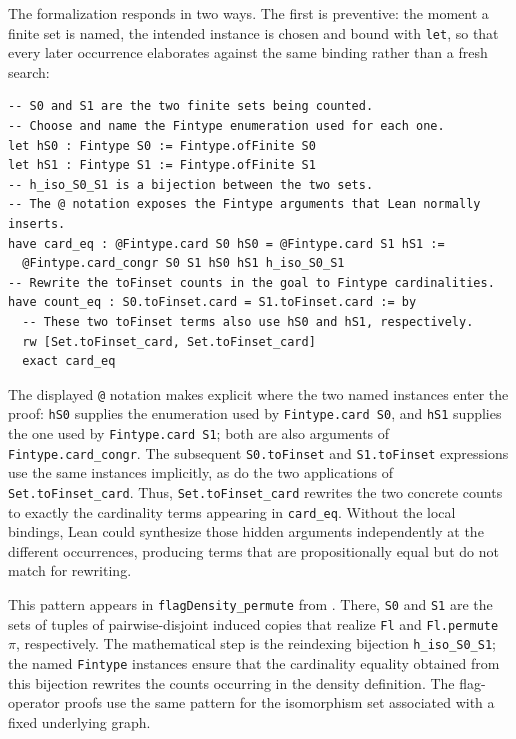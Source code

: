 \documentclass{article}
\newcommand{\lean}[1]{\texttt{#1}}
\begin{document}
The formalization responds in two ways.  The first is preventive: the
moment a finite set is named, the intended instance is chosen and bound
with \lean{let}, so that every later occurrence elaborates against the same
binding rather than a fresh search:
\begin{lstlisting}
-- S0 and S1 are the two finite sets being counted.
-- Choose and name the Fintype enumeration used for each one.
let hS0 : Fintype S0 := Fintype.ofFinite S0
let hS1 : Fintype S1 := Fintype.ofFinite S1
-- h_iso_S0_S1 is a bijection between the two sets.
-- The @ notation exposes the Fintype arguments that Lean normally inserts.
have card_eq : @Fintype.card S0 hS0 = @Fintype.card S1 hS1 :=
  @Fintype.card_congr S0 S1 hS0 hS1 h_iso_S0_S1
-- Rewrite the toFinset counts in the goal to Fintype cardinalities.
have count_eq : S0.toFinset.card = S1.toFinset.card := by
  -- These two toFinset terms also use hS0 and hS1, respectively.
  rw [Set.toFinset_card, Set.toFinset_card]
  exact card_eq
\end{lstlisting}
The displayed \lean{@} notation makes explicit where the two named instances
enter the proof: \lean{hS0} supplies the enumeration used by
\lean{Fintype.card S0}, and \lean{hS1} supplies the one used by
\lean{Fintype.card S1}; both are also arguments of
\lean{Fintype.card\_congr}.  The subsequent \lean{S0.toFinset} and
\lean{S1.toFinset} expressions use the same instances implicitly, as do the
two applications of \lean{Set.toFinset\_card}.  Thus,
\lean{Set.toFinset\_card} rewrites the two concrete counts to exactly the
cardinality terms appearing in \lean{card\_eq}.  Without the local bindings,
Lean could synthesize those hidden arguments independently at the different
occurrences, producing terms that are propositionally equal but do not match
for rewriting.

This pattern appears in \lean{flagDensity\allowbreak\_permute} from
.  There, \lean{S0} and \lean{S1} are the
sets of tuples of pairwise-disjoint induced copies that realize \lean{Fl} and
\lean{Fl.permute $\pi$}, respectively.  The mathematical step is the
reindexing bijection \lean{h\_iso\_S0\_S1}; the named \lean{Fintype}
instances ensure that the cardinality equality obtained from this bijection
rewrites the counts occurring in the density definition.  The flag-operator
proofs use the same pattern for the isomorphism set associated with a fixed
underlying graph.
\end{document}
